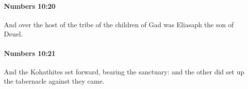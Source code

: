 		\paragraph{Numbers 10:20} %
			\label{NUMBERS-10-20}

			And over the host of the tribe of the children of Gad was Eliasaph the son of Deuel.


		\paragraph{Numbers 10:21} %
			\label{NUMBERS-10-21}

			And the Kohathites set forward, bearing the sanctuary: and the other did set up the tabernacle against they came.


